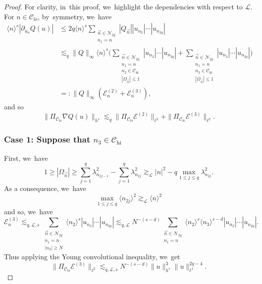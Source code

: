 \documentclass[10pt,a4paper]{amsart}
\theoremstyle{plain}
\theoremstyle{definition}
\DeclareMathOperator{\hi}{hi}
\DeclareMathOperator{\lo}{lo}
\newcommand{\1}{\mathbf{1}}
\newcommand{\Clo}{\mathscr{C}_{\lo}}
\newcommand{\Chigh}{\mathscr{C}_{\hi}}
\begin{document}
\begin{proof} For clarity, in~this proof, we~highlight the dependencies with respect to $\mathscr{L}$. For $n\in\Clo$, by~symmetry, we~have\vspace*{-3pt}
\begin{equation*}
\begin{split}
\langle n\rangle^{s}|\partial_{\overline{u_n}} Q(u)| &\leq 2q\langle n\rangle^{s}\sum_{\substack{\vec{n}\in\mathcal{N}_{2q} \\n_{1}=n}}|Q_{\vec{n}}||u_{n_{2}}|\cdots|u_{n_{2q}}| \\
&\lesssim_q \|Q\|_{\infty}\langle n\rangle^{s} \big(\sum_{\substack{\vec{n}\in\mathcal{N}_{2q}\\n_{1}=n \\ n_2 \in \Chigh \\ |\Omega_{\vec{n}}|\leq 1 }}|u_{n_{2}}|\cdots|u_{n_{2q}}| + \sum_{\substack{\vec{n}\in\mathcal{N}_{2q}\\n_{1}=n \\ n_3 \in \Chigh \\ |\Omega_{\vec{n}}|\leq 1 }}|u_{n_{2}}|\cdots|u_{n_{2q}}| \big) \\ & =: \|Q\|_{\infty} (\mathcal{E}^{(2)}_n + \mathcal{E}^{(3)}_n),
\end{split}
\end{equation*}
and so\vspace*{-3pt}
\[
\|\Pi_{\Clo} \nabla Q(u)\|_{h^{s}} \lesssim_q \| \Pi_{\Clo} \mathcal{E}^{(2)} \|_{\ell^2} + \| \Pi_{\Clo} \mathcal{E}^{(3)} \|_{\ell^2}.
\]

\subsubsection*{Case 1: Suppose that $n_3 \in \Chigh$}
First, we~have\vspace*{-3pt}
\[
1\geq |\Omega_{\vec{n}}| \geq \sum_{j=1}^q \lambda_{n_{2j-1}}^2 - \sum_{j=1}^q \lambda_{n_{2j}}^2 \gtrsim_{\mathscr{L}} |n|^2 - q\max_{1\leq j \leq q} \lambda_{n_{2j}}^2.
\]
As a consequence, we~have\vspace*{-3pt}
\[
\max_{1\leq j \leq q} \langle n_{2j} \rangle^2 \gtrsim_{\mathscr{L}} \langle n\rangle^2
\]
and so, we~have
\[
\mathcal{E}^{(3)}_n \lesssim_{q,\mathscr{L},s} \sum_{\substack{\vec{n}\in\mathcal{N}_{2q}\\ n_1=n \\ |n_3| \geq N }} \langle n_2 \rangle^{s} |u_{n_{2}}|\cdots|u_{n_{2q}}| \lesssim_{q,\mathscr{L}} N^{-(s-d)} \sum_{\substack{\vec{n}\in\mathcal{N}_{2q}\\ n_1=n}} \langle n_2 \rangle^{s} \langle n_3 \rangle^{s-d} |u_{n_{2}}|\cdots|u_{n_{2q}}|.
\]
Thus applying the Young convolutional inequality, we~get\vspace*{-3pt}
\[
\| \Pi_{\Clo} \mathcal{E}^{(3)} \|_{\ell^2} \lesssim_{q,\mathscr{L},s} N^{-(s-d)}\|u\|_{h^{s}}^{3}\|u\|_{\ell^{1}}^{2q-4}.
\]


\end{proof}
\end{document}
